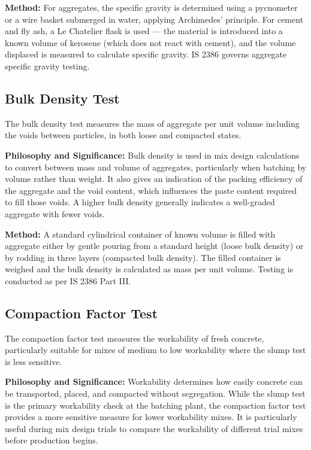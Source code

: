 \par\noindent
\textbf{Method:} For aggregates, the specific gravity is determined using a pycnometer or a wire basket submerged in water, applying Archimedes' principle. For cement and fly ash, a Le Chatelier flask is used --- the material is introduced into a known volume of kerosene (which does not react with cement), and the volume displaced is measured to calculate specific gravity. IS 2386 governs aggregate specific gravity testing.

\subsection{Bulk Density Test}
\par\noindent
The bulk density test measures the mass of aggregate per unit volume including the voids between particles, in both loose and compacted states.

\par\noindent
\textbf{Philosophy and Significance:} Bulk density is used in mix design calculations to convert between mass and volume of aggregates, particularly when batching by volume rather than weight. It also gives an indication of the packing efficiency of the aggregate and the void content, which influences the paste content required to fill those voids. A higher bulk density generally indicates a well-graded aggregate with fewer voids.

\par\noindent
\textbf{Method:} A standard cylindrical container of known volume is filled with aggregate either by gentle pouring from a standard height (loose bulk density) or by rodding in three layers (compacted bulk density). The filled container is weighed and the bulk density is calculated as mass per unit volume. Testing is conducted as per IS 2386 Part III.

\subsection{Compaction Factor Test}
\par\noindent
The compaction factor test measures the workability of fresh concrete, particularly suitable for mixes of medium to low workability where the slump test is less sensitive.

\par\noindent
\textbf{Philosophy and Significance:} Workability determines how easily concrete can be transported, placed, and compacted without segregation. While the slump test is the primary workability check at the batching plant, the compaction factor test provides a more sensitive measure for lower workability mixes. It is particularly useful during mix design trials to compare the workability of different trial mixes before production begins.

